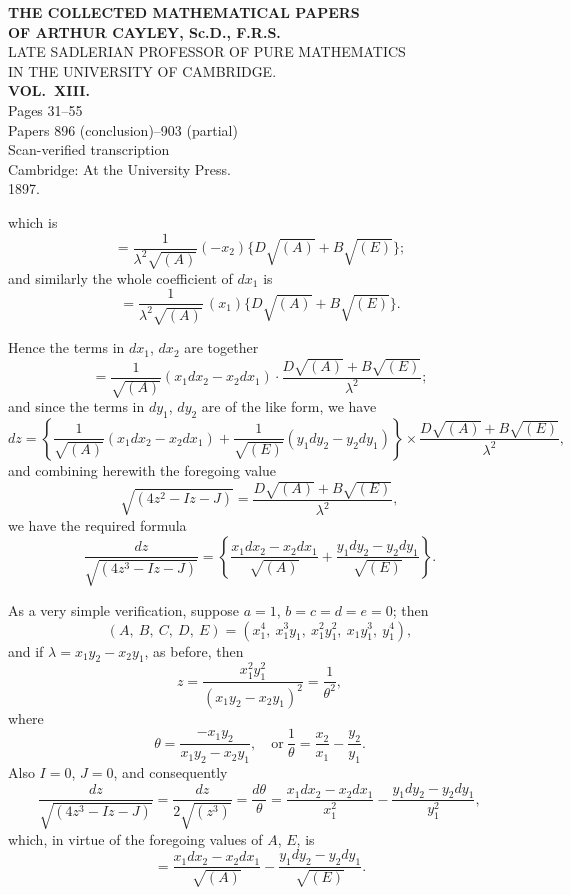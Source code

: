 \documentclass[11pt,a4paper]{article}
\begin{document}
\thispagestyle{empty}
\begin{center}
\vspace*{2cm}
{\LARGE\bfseries THE COLLECTED MATHEMATICAL PAPERS\\[0.5em] OF ARTHUR CAYLEY, Sc.D., F.R.S.\\[1em]}
{\Large LATE SADLERIAN PROFESSOR OF PURE MATHEMATICS\\ IN THE UNIVERSITY OF CAMBRIDGE.\\[2em]}
{\LARGE\bfseries VOL.\ XIII.\\[2em]}
{\large Pages 31--55\\[0.5em] Papers 896 (conclusion)--903 (partial)\\[2em]}
{\large Scan-verified transcription\\[3em]}
\vfill
{\large Cambridge: At the University Press.\\ 1897.\\[1em]}
\end{center}
\clearpage

\setcounter{page}{31}


\noindent which is
\[
= \frac{1}{\lambda^2 \sqrt{(A)}}(-x_2)\{D\sqrt{(A)} + B\sqrt{(E)}\};
\]
and similarly the whole coefficient of $dx_1$ is
\[
= \frac{1}{\lambda^2 \sqrt{(A)}}\,(x_1)\{D\sqrt{(A)} + B\sqrt{(E)}\}.
\]

Hence the terms in $dx_1$, $dx_2$ are together
\[
= \frac{1}{\sqrt{(A)}}(x_1 dx_2 - x_2 dx_1) \cdot \frac{D\sqrt{(A)} + B\sqrt{(E)}}{\lambda^2};
\]
and since the terms in $dy_1$, $dy_2$ are of the like form, we have
\[
dz = \left\{\frac{1}{\sqrt{(A)}}(x_1 dx_2 - x_2 dx_1) + \frac{1}{\sqrt{(E)}}(y_1 dy_2 - y_2 dy_1)\right\} \times \frac{D\sqrt{(A)} + B\sqrt{(E)}}{\lambda^2},
\]
and combining herewith the foregoing value
\[
\sqrt{(4z^2 - Iz - J)} = \frac{D\sqrt{(A)} + B\sqrt{(E)}}{\lambda^2},
\]
we have the required formula
\[
\frac{dz}{\sqrt{(4z^3 - Iz - J)}} = \left\{\frac{x_1 dx_2 - x_2 dx_1}{\sqrt{(A)}} + \frac{y_1 dy_2 - y_2 dy_1}{\sqrt{(E)}}\right\}.
\]

As a very simple verification, suppose $a = 1$, $b = c = d = e = 0$; then
\[
(A,\ B,\ C,\ D,\ E) = (x_1^4,\ x_1^3 y_1,\ x_1^2 y_1^2,\ x_1 y_1^3,\ y_1^4),
\]
and if $\lambda = x_1 y_2 - x_2 y_1$, as before, then
\[
z = \frac{x_1^2 y_1^2}{(x_1 y_2 - x_2 y_1)^2} = \frac{1}{\theta^2},
\]
where
\[
\theta = \frac{-x_1 y_2}{x_1 y_2 - x_2 y_1},\quad \text{or}\ \frac{1}{\theta} = \frac{x_2}{x_1} - \frac{y_2}{y_1}.
\]
Also $I = 0$, $J = 0$, and consequently
\[
\frac{dz}{\sqrt{(4z^3 - Iz - J)}} = \frac{dz}{2 \sqrt{(z^3)}} = \frac{d\theta}{\theta} = \frac{x_1 dx_2 - x_2 dx_1}{x_1^2} - \frac{y_1 dy_2 - y_2 dy_1}{y_1^2},
\]
which, in virtue of the foregoing values of $A$, $E$, is
\[
= \frac{x_1 dx_2 - x_2 dx_1}{\sqrt{(A)}} - \frac{y_1 dy_2 - y_2 dy_1}{\sqrt{(E)}}.
\]
\end{document}
